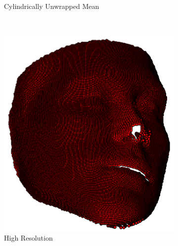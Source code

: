 \begin{figure}
\begin{subfigure}[b]{0.63\textwidth}
        \caption{Cylindrically Unwrapped Mean}\label{subfig:face_flow_cylin_unwrap}
    \end{subfigure} \\
    \begin{subfigure}[b]{0.49\textwidth}
        \centering
        \includegraphics[width=\textwidth]{face_flow/images/contour_snapping/example_instance_high}
        \caption{High Resolution}\label{subfig:face_flow_instance_high}
    \end{subfigure}
    \begin{subfigure}[b]{0.49\textwidth}
        \centering

\end{subfigure}
\end{figure}
